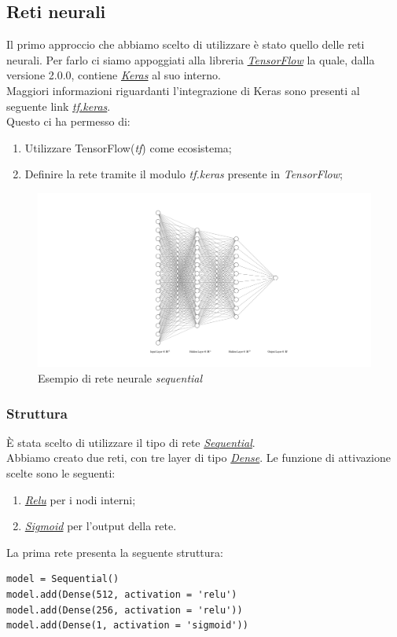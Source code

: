 \subsection{Reti neurali}
Il primo approccio che abbiamo scelto di utilizzare è stato quello delle reti neurali.
Per farlo ci siamo appoggiati alla libreria \href{https://www.tensorflow.org/}{\textit{TensorFlow}} la quale, dalla versione 2.0.0, contiene \href{https://keras.io/}{\textit{Keras}} al suo interno.\\
Maggiori informazioni riguardanti l'integrazione di Keras sono presenti al seguente link \href{https://www.tensorflow.org/guide/keras}{\textit{tf.keras}}.\\ 
Questo ci ha permesso di:
\begin{enumerate}
	\item Utilizzare TensorFlow(\textit{tf}) come ecosistema;
	\item Definire la rete tramite il modulo \textit{tf.keras} presente in \textit{TensorFlow};
\end{enumerate} 
\begin{figure}[H]
	\includegraphics[keepaspectratio = true, scale=0.4,center]{img/nnExample.png}
	\caption{Esempio di rete neurale \textit{sequential}}
\end{figure}

\subsubsection{Struttura}
È stata scelto di utilizzare il tipo di rete \href{https://keras.io/getting-started/sequential-model-guide/}{\textit{Sequential}}.\\ 
Abbiamo creato due reti, con tre layer di tipo \href{https://keras.io/layers/core/}{\textit{Dense}}.
Le funzione di attivazione scelte sono le seguenti:
\begin{enumerate}
	\item \href{https://keras.io/activations/#relu}{\textit{Relu}} per i nodi interni;
	\item \href{https://keras.io/activations/#sigmoid}{\textit{Sigmoid}} per l'output della rete.
\end{enumerate}
La prima rete presenta la seguente struttura:
\begin{lstlisting}[backgroundcolor = \color{white}]
model = Sequential()  
model.add(Dense(512, activation = 'relu')
model.add(Dense(256, activation = 'relu'))
model.add(Dense(1, activation = 'sigmoid'))
\end{lstlisting}


